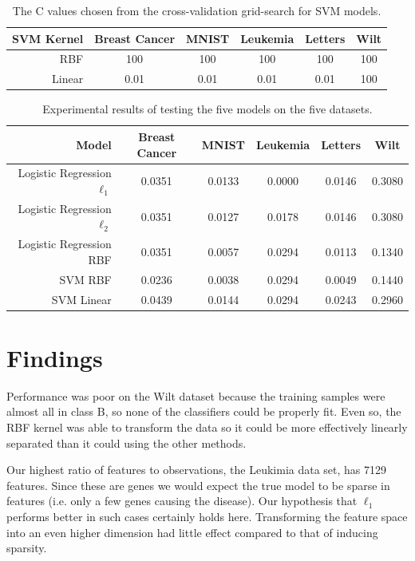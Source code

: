 \documentclass[letterpaper, 11pt]{article}
\begin{document}
\begin{table}[h]
  \centering
  \begin{tabular}{r|c c c c c}
     SVM Kernel & Breast Cancer & MNIST & Leukemia & Letters & Wilt \\
     \hline
      RBF  & 100 & 100 & 100 & 100 & 100 \\
      Linear & 0.01 & 0.01 & 0.01 & 0.01 & 100 \\
\end{tabular}
      \caption{The C values chosen from the cross-validation grid-search for SVM models.}
\end{table}

\begin{table}[h]
  \centering
  \begin{tabular}{r|c c c c c}
     Model & Breast Cancer & MNIST & Leukemia & Letters & Wilt \\
     \hline
      Logistic Regression $\ell_1$ & 0.0351 & 0.0133 & 0.0000 & 0.0146 & 0.3080 \\
      Logistic Regression $\ell_2$ & 0.0351 & 0.0127 & 0.0178 & 0.0146 & 0.3080 \\
      Logistic Regression RBF      & 0.0351 & 0.0057 & 0.0294 & 0.0113 & 0.1340 \\
      SVM RBF                      & 0.0236 & 0.0038 & 0.0294 & 0.0049 & 0.1440 \\
      SVM Linear                   & 0.0439 & 0.0144 & 0.0294 & 0.0243 & 0.2960 \\
\end{tabular}
      \caption{Experimental results of testing the five models on the five datasets.}
\end{table}

\section{Findings}

Performance was poor on the Wilt dataset because the training samples were almost all in class B, so none of the classifiers could be properly fit. Even so, the RBF kernel was able to transform the data so it could be more effectively linearly separated than it could using the other methods.

Our highest ratio of features to observations, the Leukimia data set, has 7129 features. Since these are genes we would expect the true model to be sparse in features (i.e. only a few genes causing the disease). Our hypothesis that $\ell_1$ performs better in such cases certainly holds here. Transforming the feature space into an even higher dimension had little effect compared to that of inducing sparsity.
\end{document}
